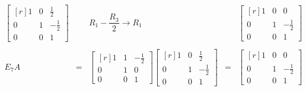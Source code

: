 \begin{enumerate}
    $$\begin{array}{rcccc}
	\begin{bmatrix*}[r]
	    1 & 0 & \frac{1}{2}\\
	    0 & 1 & -\frac{1}{2}\\
	    0 & 0 & 1 
	\end{bmatrix*} && R_1-\dfrac{R_3}{2}\to R_1 & &
	\begin{bmatrix*}[r]
	    1 & 0 & 0\\
	    0 & 1 & -\frac{1}{2}\\
	    0 & 0 & 1 
	\end{bmatrix*} \\\\
	E_7A&=&\begin{bmatrix*}[r]
	    1 & 1 & -\frac{1}{2}\\
	    0 & 1 & 0\\
	    0 & 0 & 1 
	\end{bmatrix*} 
	\begin{bmatrix*}[r]
	    1 & 0 & \frac{1}{2}\\
	    0 & 1 & -\frac{1}{2}\\
	    0 & 0 & 1 
	\end{bmatrix*} &=& 
	\begin{bmatrix*}[r]
	    1 & 0 & 0\\
	    0 & 1 & -\frac{1}{2}\\
	    0 & 0 & 1 
	\end{bmatrix*} \\\\
    \end{array}$$


\end{enumerate}
